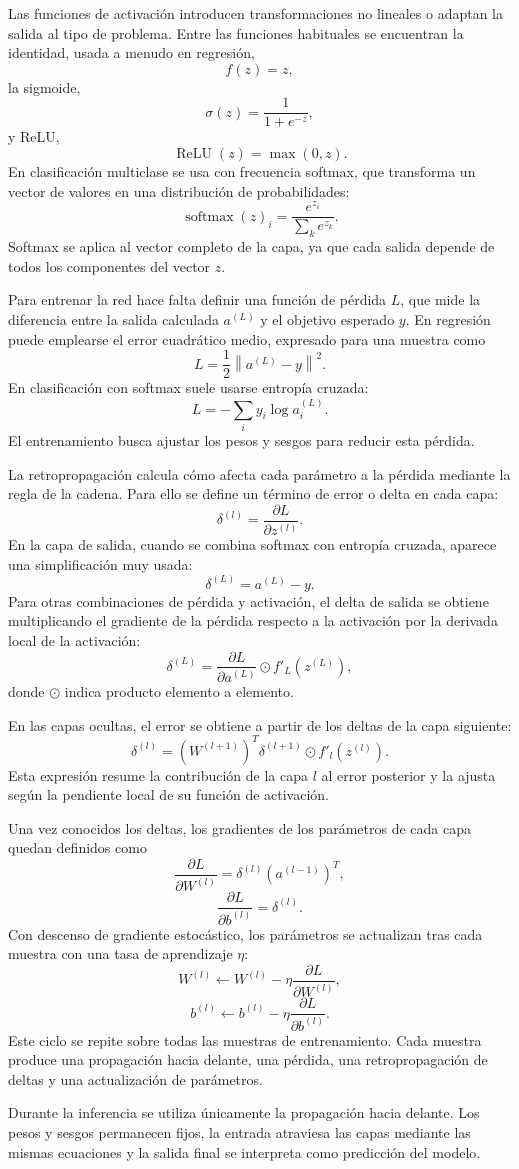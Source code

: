 Las funciones de activación introducen transformaciones no lineales o adaptan la salida al tipo de problema.
Entre las funciones habituales se encuentran la identidad, usada a menudo en regresión,
\[
f(z)=z,
\]
la sigmoide,
\[
\sigma(z)=\frac{1}{1+e^{-z}},
\]
y ReLU,
\[
\operatorname{ReLU}(z)=\max(0,z).
\]
En clasificación multiclase se usa con frecuencia softmax, que transforma un vector de valores en una distribución de probabilidades:
\[
\operatorname{softmax}(z)_i = \frac{e^{z_i}}{\sum_k e^{z_k}}.
\]
Softmax se aplica al vector completo de la capa, ya que cada salida depende de todos los componentes del vector \(z\).

Para entrenar la red hace falta definir una función de pérdida \(L\), que mide la diferencia entre la salida calculada \(a^{(L)}\) y el objetivo esperado \(y\).
En regresión puede emplearse el error cuadrático medio, expresado para una muestra como
\[
L = \frac{1}{2}\left\|a^{(L)}-y\right\|^2.
\]
En clasificación con softmax suele usarse entropía cruzada:
\[
L = -\sum_i y_i \log a^{(L)}_i.
\]
El entrenamiento busca ajustar los pesos y sesgos para reducir esta pérdida.

La retropropagación calcula cómo afecta cada parámetro a la pérdida mediante la regla de la cadena.
Para ello se define un término de error o delta en cada capa:
\[
\delta^{(l)} = \frac{\partial L}{\partial z^{(l)}}.
\]
En la capa de salida, cuando se combina softmax con entropía cruzada, aparece una simplificación muy usada:
\[
\delta^{(L)} = a^{(L)} - y.
\]
Para otras combinaciones de pérdida y activación, el delta de salida se obtiene multiplicando el gradiente de la pérdida respecto a la activación por la derivada local de la activación:
\[
\delta^{(L)} = \frac{\partial L}{\partial a^{(L)}} \odot f'_L\left(z^{(L)}\right),
\]
donde \(\odot\) indica producto elemento a elemento.

En las capas ocultas, el error se obtiene a partir de los deltas de la capa siguiente:
\[
\delta^{(l)} = \left(W^{(l+1)}\right)^T\delta^{(l+1)} \odot f'_l\left(z^{(l)}\right).
\]
Esta expresión resume la contribución de la capa \(l\) al error posterior y la ajusta según la pendiente local de su función de activación.

Una vez conocidos los deltas, los gradientes de los parámetros de cada capa quedan definidos como
\[
\frac{\partial L}{\partial W^{(l)}} = \delta^{(l)}\left(a^{(l-1)}\right)^T,
\]
\[
\frac{\partial L}{\partial b^{(l)}} = \delta^{(l)}.
\]
Con descenso de gradiente estocástico, los parámetros se actualizan tras cada muestra con una tasa de aprendizaje \(\eta\):
\[
W^{(l)} \leftarrow W^{(l)} - \eta \frac{\partial L}{\partial W^{(l)}},
\]
\[
b^{(l)} \leftarrow b^{(l)} - \eta \frac{\partial L}{\partial b^{(l)}}.
\]
Este ciclo se repite sobre todas las muestras de entrenamiento.
Cada muestra produce una propagación hacia delante, una pérdida, una retropropagación de deltas y una actualización de parámetros.

Durante la inferencia se utiliza únicamente la propagación hacia delante.
Los pesos y sesgos permanecen fijos, la entrada atraviesa las capas mediante las mismas ecuaciones y la salida final se interpreta como predicción del modelo.
